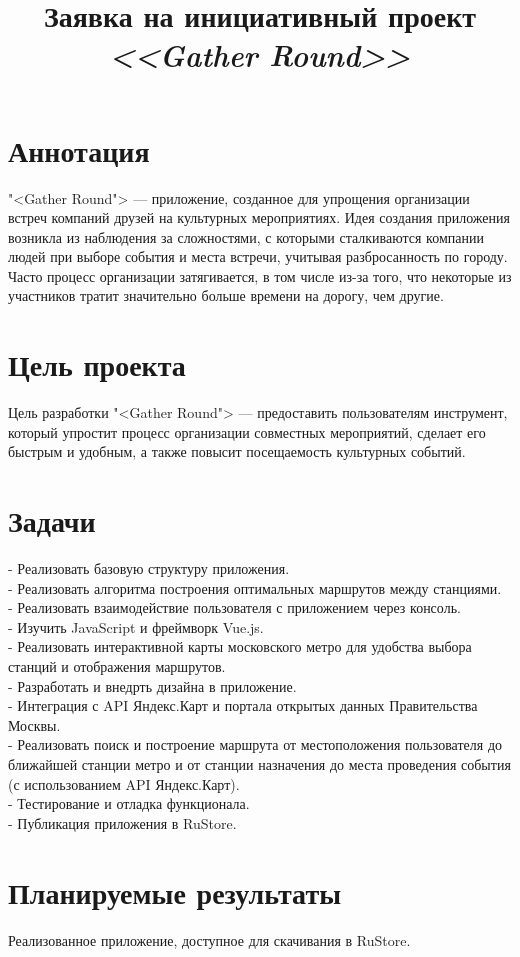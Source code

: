 \documentclass[a4paper,12pt]{extarticle}
\title{Заявка на инициативный проект \textit{<<Gather Round>>}}
\date{}
\begin{document}
\newpage
\setcounter{page}{1}
{
  \hypersetup{linkcolor=black}
}

\maketitle

\section{Аннотация}  
\noindent "<Gather Round"> — приложение, созданное для упрощения организации встреч компаний друзей на культурных мероприятиях. 
Идея создания приложения возникла из наблюдения за сложностями, с которыми сталкиваются компании людей при выборе события и места встречи, учитывая разбросанность по городу. 
Часто процесс организации затягивается, в том числе из-за того, что некоторые из участников тратит значительно больше времени на дорогу, чем другие.

\section{Цель проекта}
\noindent Цель разработки "<Gather Round"> — предоставить пользователям инструмент, который упростит процесс организации совместных мероприятий, сделает его быстрым и удобным, а также повысит посещаемость культурных событий.

\section{Задачи}
\noindent 
- Реализовать базовую структуру приложения. 
\\
- Реализовать алгоритма построения оптимальных маршрутов между станциями.
\\
- Реализовать взаимодействие пользователя с приложением через консоль.
\\
- Изучить JavaScript и фреймворк Vue.js.
\\
- Реализовать интерактивной карты московского метро для удобства выбора станций и отображения маршрутов.
\\
- Разработать и внедрть дизайна в приложение.
\\
- Интеграция с API Яндекс.Карт и портала открытых данных Правительства Москвы.
\\
- Реализовать поиск и построение маршрута от местоположения пользователя до ближайшей станции метро и от станции назначения до места проведения события 
(с использованием API Яндекс.Карт).
\\
- Тестирование и отладка функционала.
\\
- Публикация приложения в RuStore.

\section{Планируемые результаты} 
Реализованное приложение, доступное для скачивания в RuStore.
\end{document}
